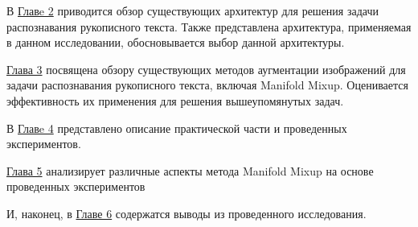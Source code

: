 В \hyperref[sec:Chapter1]{Главe 2} приводится обзор существующих архитектур для решения задачи распознавания рукописного текста. Также представлена архитектура, применяемая в данном исследовании, обосновывается выбор данной архитектуры.


\hyperref[sec:Chapter2]{Глава 3} посвящена обзору существующих методов аугментации изображений для задачи распознавания рукописного текста, включая Manifold Mixup. Оценивается эффективность их применения для решения вышеупомянутых задач.

В \hyperref[sec:Chapter3]{Главe 4} представлено описание практической части и проведенных экспериментов.

\hyperref[sec:Chapter4]{Глава 5}  анализирует различные аспекты метода Manifold Mixup на основе проведенных экспериментов

И, наконец, в \hyperref[sec:Chapter5]{Главе 6} содержатся выводы из проведенного исследования.

\newpage